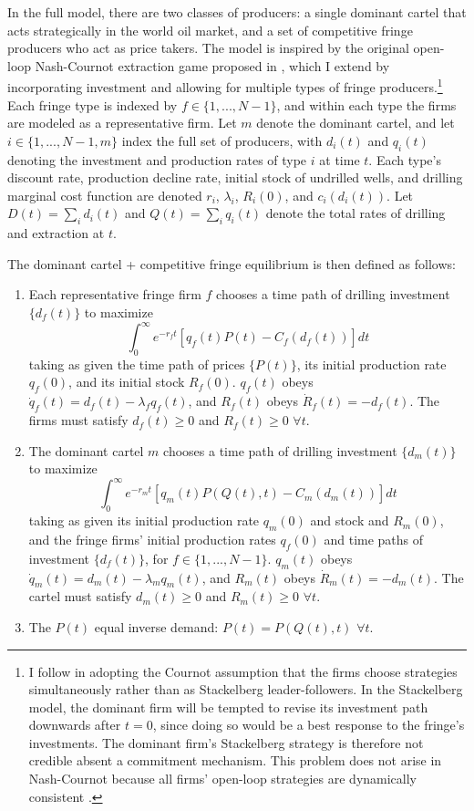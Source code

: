 \documentclass[12pt]{article}
\begin{document}
In the full model, there are two classes of producers: a single dominant cartel that acts strategically in the world oil market, and a set of competitive fringe producers who act as price takers. The model is inspired by the original open-loop Nash-Cournot extraction game proposed in \cite{salant1976}, which I extend by incorporating investment and allowing for multiple types of fringe producers.\footnote{I follow \cite{salant1976} in adopting the Cournot assumption that the firms choose strategies simultaneously rather than as Stackelberg leader-followers. In the Stackelberg model, the dominant firm will be tempted to revise its investment path downwards after $t=0$, since doing so would be a best response to the fringe's investments. The dominant firm's Stackelberg strategy is therefore not credible absent a commitment mechanism. This problem does not arise in Nash-Cournot because all firms' open-loop strategies are dynamically consistent \citep{hanleyshogrenwhite1997}.} Each fringe type is indexed by $f\in\{1,...,N-1\}$, and within each type the firms are modeled as a representative firm. Let $m$ denote the dominant cartel, and let $i\in\{1,...,N-1,m\}$ index the full set of producers, with $d_i(t)$ and $q_i(t)$ denoting the investment and production rates of type $i$ at time $t$. Each type's discount rate, production decline rate, initial stock of undrilled wells, and drilling marginal cost function are denoted $r_i$, $\lambda_i$, $R_i(0)$, and $c_i(d_i(t))$. Let $D(t)=\sum_id_i(t)$ and $Q(t)=\sum_iq_i(t)$ denote the total rates of drilling and extraction at $t$.

The dominant cartel + competitive fringe equilibrium is then defined as follows:
\begin{enumerate}
\item Each representative fringe firm $f$ chooses a time path of drilling investment $\{d_f(t)\}$ to maximize
\begin{equation}
\int_0^\infty e^{-r_ft} \left[q_f(t)P(t) - C_f(d_f(t)) \right] dt \label{eq:maximand_f}
\end{equation}
\noindent taking as given the time path of prices $\{P(t)\}$, its initial production rate $q_f(0)$, and its initial stock $R_f(0)$. $q_f(t)$ obeys $\dot{q}_f(t)=d_f(t)-\lambda_f q_f(t)$, and $R_f(t)$ obeys $\dot{R}_f(t)=-d_f(t)$. The firms must satisfy $d_f(t)\geq0$ and $R_f(t)\geq0$ $\forall t$.
\item The dominant cartel $m$ chooses a time path of drilling investment $\{d_m(t)\}$ to maximize
\begin{equation}
\int_0^\infty e^{-r_mt} \left[q_m(t)P(Q(t),t) - C_m(d_m(t)) \right] dt \label{eq:maximand_f}
\end{equation}
\noindent taking as given its initial production rate $q_m(0)$ and stock and $R_m(0)$, and the fringe firms' initial production rates $q_f(0)$ and time paths of investment $\{d_f(t)\}$, for $f\in\{1,...,N-1\}$. $q_m(t)$ obeys $\dot{q}_m(t)=d_m(t)-\lambda_m q_m(t)$, and $R_m(t)$ obeys $\dot{R}_m(t)=-d_m(t)$. The cartel must satisfy $d_m(t)\geq0$ and $R_m(t)\geq0$ $\forall t$.
\item The $P(t)$ equal inverse demand: $P(t)=P(Q(t),t)$ $\forall t$.
\end{enumerate}
\end{document}
